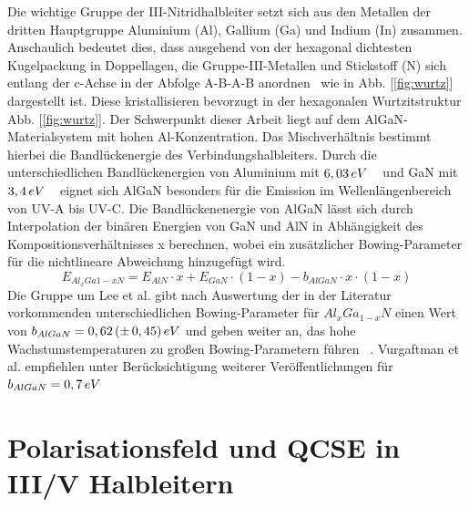 Die wichtige Gruppe der III-Nitridhalbleiter setzt sich aus den Metallen
der dritten Hauptgruppe Aluminium (Al), Gallium (Ga) und Indium (In) zusammen.
Anschaulich bedeutet dies, dass ausgehend von der hexagonal dichtesten Kugelpackung in Doppellagen, die Gruppe-III-Metallen und Stickstoff (N) sich entlang der c-Achse in der Abfolge A-B-A-B anordnen~\cite{buchc} wie in Abb. [\ref{fig:wurtz}] dargestellt ist. 
Diese kristallisieren bevorzugt in der hexagonalen Wurtzitstruktur Abb. [\ref{fig:wurtz}].
Der Schwerpunkt dieser Arbeit liegt auf dem AlGaN-Materialsystem mit hohen Al-Konzentration. Das Mischverhältnis bestimmt hierbei die Bandlückenergie des Verbindungshalbleiters. Durch die unterschiedlichen Bandlückenergien von Aluminium mit $6,03 \thinspace eV$ ~\cite{fenaln} und GaN mit $3,4 \thinspace eV$ ~\cite{pipr} eignet sich AlGaN besonders für die Emission im Wellenlängenbereich von UV-A bis UV-C. 
Die Bandlückenenergie von AlGaN lässt sich durch Interpolation der binären Energien von GaN und AlN in Abhängigkeit des Kompositionsverhältnisses x berechnen, wobei ein zusätzlicher Bowing-Parameter für die nichtlineare Abweichung hinzugefügt wird. 
%
\begin{equation}
    E_{Al_{x}Ga{1-x}N} = E_{AlN} \cdot x + E_{GaN} \cdot (1-x) - b_{AlGaN} \cdot x \cdot (1-x) 
\end{equation}
%
Die Gruppe um Lee et al. gibt nach Auswertung der in der Literatur vorkommenden unterschiedlichen Bowing-Parameter für $Al_{x}Ga_{1-x}N$ einen Wert von $b_{AlGaN} = 0,62\thinspace(\pm \thinspace 0,45)\thinspace eV$ und geben weiter an, das hohe Wachstumstemperaturen zu großen Bowing-Parametern führen ~\cite{doi:10.1063/1.123339}.
Vurgaftman et al. empfiehlen unter Berücksichtigung weiterer Veröffentlichungen für $b_{AlGaN} =  0,7 \thinspace eV$ 
%
\newpage
\section{Polarisationsfeld und QCSE in III/V Halbleitern}


